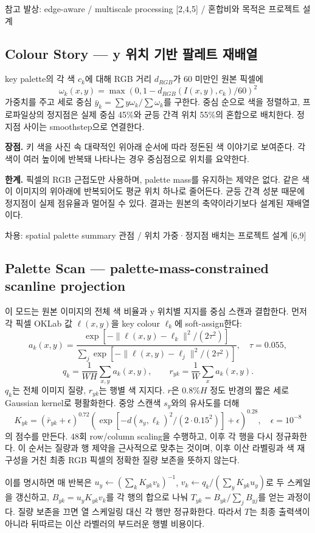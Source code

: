 \documentclass[10pt]{article}
\newcommand{\tagline}[1]{\textcolor{moss}{\small\textsf{#1}}}
\newcommand{\good}{\textbf{장점.} }
\newcommand{\trade}{\textbf{한계.} }
\begin{document}
\tagline{참고 발상: edge-aware / multiscale processing [2,4,5] / 혼합비와 목적은 프로젝트 설계}

\subsection{Colour Story --- y 위치 기반 팔레트 재배열}
key palette의 각 색 $c_k$에 대해 RGB 거리 $d_{RGB}$가 60 미만인 원본 픽셀에
\[
\omega_k(x,y)=\max(0,1-d_{RGB}(I(x,y),c_k)/60)^2
\]
가중치를 주고 세로 중심 $\bar y_k=\sum y\omega_k/\sum\omega_k$를 구한다. 중심 순으로 색을 정렬하고, 프로파일상의 정지점은 실제 중심 45\%와 균등 간격 위치 55\%의 혼합으로 배치한다. 정지점 사이는 smoothstep으로 연결한다.

\good 키 색을 사진 속 대략적인 위아래 순서에 따라 정돈된 색 이야기로 보여준다. 각 색이 여러 높이에 반복돼 나타나는 경우 중심점으로 위치를 요약한다.

\trade 픽셀의 RGB 근접도만 사용하며, palette mass를 유지하는 제약은 없다. 같은 색이 이미지의 위아래에 반복되어도 평균 위치 하나로 줄어든다. 균등 간격 성분 때문에 정지점이 실제 점유율과 멀어질 수 있다. 결과는 원본의 축약이라기보다 설계된 재배열이다.

\tagline{차용: spatial palette summary 관점 / 위치 가중·정지점 배치는 프로젝트 설계 [6,9]}

\subsection{Palette Scan --- palette-mass-constrained scanline projection}
이 모드는 원본 이미지의 전체 색 비율과 y 위치별 지지를 중심 스캔과 결합한다. 먼저 각 픽셀 OKLab 값 $\ell(x,y)$을 key colour $\ell_k$에 soft-assign한다:
\[
a_k(x,y)=\frac{\exp[-\|\ell(x,y)-\ell_k\|^2/(2\tau^2)]}{\sum_j\exp[-\|\ell(x,y)-\ell_j\|^2/(2\tau^2)]},\quad \tau=0.055,
\]
\[
q_k=\frac{1}{WH}\sum_{x,y}a_k(x,y),\qquad r_{yk}=\frac{1}{W}\sum_x a_k(x,y).
\]
$q_k$는 전체 이미지 질량, $r_{yk}$는 행별 색 지지다. $r$은 $0.8\%H$ 정도 반경의 짧은 세로 Gaussian kernel로 평활화한다. 중앙 스캔색 $s_y$와의 유사도를 더해
\[
K_{yk}=(\bar r_{yk}+\epsilon)^{0.72}
\left(\exp[-d(s_y,\ell_k)^2/(2\cdot0.15^2)]+\epsilon\right)^{0.28},\quad \epsilon=10^{-8}
\]
의 점수를 만든다. 48회 row/column scaling을 수행하고, 이후 각 행을 다시 정규화한다. 이 순서는 질량과 행 제약을 근사적으로 맞추는 것이며, 이후 이산 라벨링과 색 재구성을 거친 최종 RGB 픽셀의 정확한 질량 보존을 뜻하지 않는다.

이를 명시하면 매 반복은 $u_y\leftarrow(\sum_kK_{yk}v_k)^{-1}$, $v_k\leftarrow q_k/(\sum_yK_{yk}u_y)$로 두 스케일을 갱신하고, $B_{yk}=u_yK_{yk}v_k$를 각 행의 합으로 나눠 $T_{yk}=B_{yk}/\sum_jB_{yj}$를 얻는 과정이다. 질량 보존을 끄면 열 스케일링 대신 각 행만 정규화한다. 따라서 $T$는 최종 출력색이 아니라 뒤따르는 이산 라벨러의 부드러운 행별 비용이다.
\end{document}

